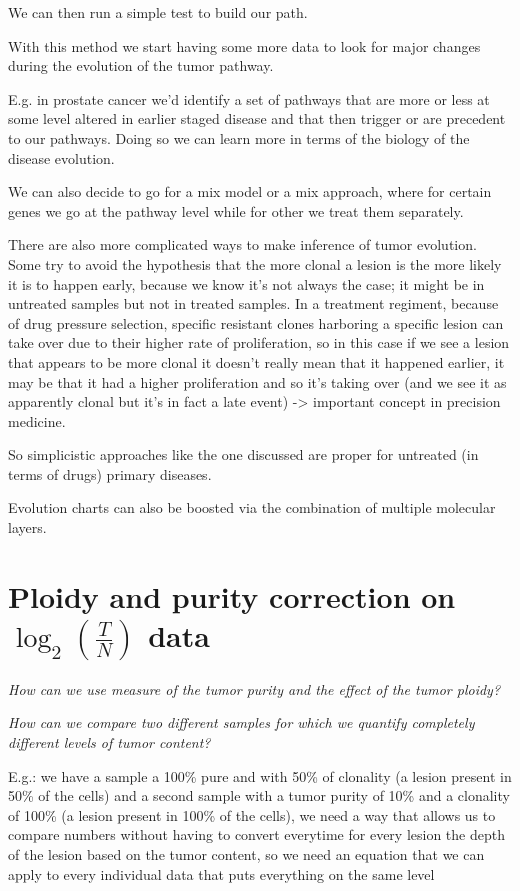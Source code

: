We can then run a simple test to build our path.

With this method we start having some more data to look for major changes during
the evolution of the tumor pathway.

E.g. in prostate cancer we'd identify a set of pathways that are more or less at
some level altered in earlier staged disease and that then trigger or are
precedent to our pathways. Doing so we can learn more in terms of the biology of
the disease evolution.

We can also decide to go for a mix model or a mix approach, where for certain
genes we go at the pathway level while for other we treat them separately.

There are also more complicated ways to make inference of tumor evolution. Some
try to avoid the hypothesis that the more clonal a lesion is the more likely it
is to happen early, because we know it's not always the case; it might be in
untreated samples but not in treated samples. In a treatment regiment, because
of drug pressure selection, specific resistant clones harboring a specific
lesion can take over due to their higher rate of proliferation, so in this case
if we see a lesion that appears to be more clonal it doesn't really mean that it
happened earlier, it may be that it had a higher proliferation and so it's
taking over (and we see it as apparently clonal but it's in fact a late event)
-\textgreater{} important concept in precision medicine.

So simplicistic approaches like the one discussed are proper for untreated (in
terms of drugs) primary diseases.

Evolution charts can also be boosted via the combination of multiple molecular
layers.

\section{Ploidy and purity correction on $\log_2(\frac{T}{N})$ data}

\emph{How can we use measure of the tumor purity and the effect of the tumor
ploidy?}

\emph{How can we compare two different samples for which we quantify completely
different levels of tumor content?}

E.g.: we have a sample a 100\% pure and with 50\% of clonality (a lesion present
in 50\% of the cells) and a second sample with a tumor purity of 10\% and a
clonality of 100\% (a lesion present in 100\% of the cells), we need a way that
allows us to compare numbers without having to convert everytime for every
lesion the depth of the lesion based on the tumor content, so we need an
equation that we can apply to every individual data that puts everything on the
same level

